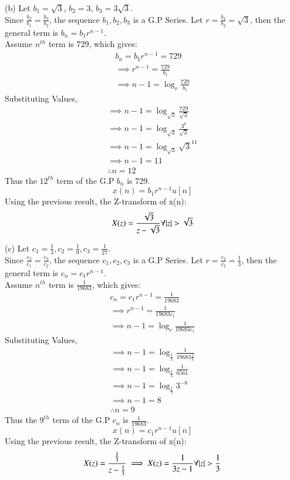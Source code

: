 \documentclass[journal,12pt,twocolumn]{IEEEtran}
\theoremstyle{remark}
\begin{document}
(b) Let $b_1 = \sqrt{3}$, $b_2 = 3$, $b_3 = 3\sqrt{3}$.\\
Since $\frac{b_2}{b_1} = \frac{b_3}{b_2}$, the sequence $b_1, b_2, b_3$ is a G.P Series.
Let $r = \frac{b_2}{b_2} = \sqrt{3}$, then the general term is $b_n = b_1 r^{n-1}$.\\
Assume $n^{th}$ term is 729, which gives: 
\begin{gather*}
    b_n = b_1 r^{n-1} = 729\\
    \implies r^{n-1} = \frac{729}{b_1}\\
    \implies n - 1 = \log_{r}{\frac{729}{b_1}}
\end{gather*}
Substituting Values,
\begin{gather*}
    \implies n - 1 = \log_{\sqrt{3}}{\frac{729}{\sqrt{3}}}\\
    \implies n - 1 = \log_{\sqrt{3}}{\frac{3^6}{\sqrt{3}}}\\
    \implies n - 1 = \log_{\sqrt{3}}{\sqrt{3}^{11}}\\
    \implies n - 1 = 11\\
    \therefore n = 12
\end{gather*}
Thus the $12^{th}$ term of the G.P $b_n$ is 729.
\[ x(n) = b_1r^{n - 1}u[n] \]
Using the previous result, the Z-transform of x(n):
\[X(z) = \frac{\sqrt{3}}{z - \sqrt{3}}\forall { \left\vert z\right\vert > \sqrt{3}}\]


(c) Let $c_1 = \frac{1}{3}, c_2 = \frac{1}{9}, c_3 = \frac{1}{27}$.\\
Since $\frac{c_2}{c_1} = \frac{c_3}{c_2}$, the sequence $c_1, c_2, c_3$ is a G.P Series.
Let $r = \frac{c_2}{c_2} = \frac{1}{3}$, then the general term is $c_n = c_1 r^{n-1}$.\\
Assume $n^{th}$ term is $\frac{1}{19683}$, which gives: 
\begin{gather*}
    c_n = c_1 r^{n-1} = \frac{1}{19683}\\
    \implies r^{n-1} = \frac{1}{19683 c_1}\\
    \implies n - 1 = \log_{r}{\frac{1}{19683 c_1}}
\end{gather*}
Substituting Values,
\begin{gather*}
    \implies n - 1 = \log_{\frac{1}{3}}{\frac{1}{19683 \frac{1}{3}}}\\
    \implies n - 1 = \log_{\frac{1}{3}}{\frac{1}{6561}}\\
    \implies n - 1 = \log_{\frac{1}{3}}{3^{-8}}\\
    \implies n - 1 = 8\\
    \therefore n = 9
\end{gather*}
Thus the $9^{th}$ term of the G.P $c_n$ is $\frac{1}{19683}$.
\[ x(n) = c_1r^{n - 1}u[n] \]
Using the previous result, the Z-transform of x(n):
\[
    X(z) = \frac{\frac{1}{3}}{z - \frac{1}{3}}
    \implies X(z) = \frac{1 }{3z - 1}\forall { \left\vert z\right\vert > \frac{1}{3}}
\]
\end{document}
